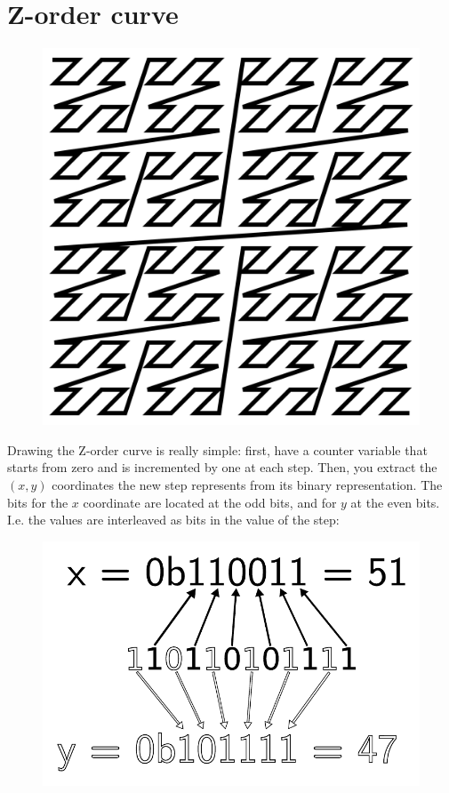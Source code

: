 \documentclass[12pt,openany,a4,usenames,dvipsnames]{book}
\begin{document}
\section{Z-order curve}
\begin{figure}[H]
  \centering
  \includegraphics[width=\textwidth,keepaspectratio]{figures/Zordercurve.pdf}
\end{figure}
Drawing the Z-order curve is really simple: first, have a counter variable that starts from zero and is incremented by one at each step. Then, you extract the $(x, y)$ coordinates the new step represents from its binary representation. The bits for the $x$ coordinate are located at the odd bits, and for $y$ at the even bits. I.e. the values are interleaved as bits in the value of the step:
\begin{figure}[H]
  \centering
  \includegraphics[width=\textwidth,keepaspectratio]{figures/zcurvebits.pdf}
\end{figure}
\end{document}
